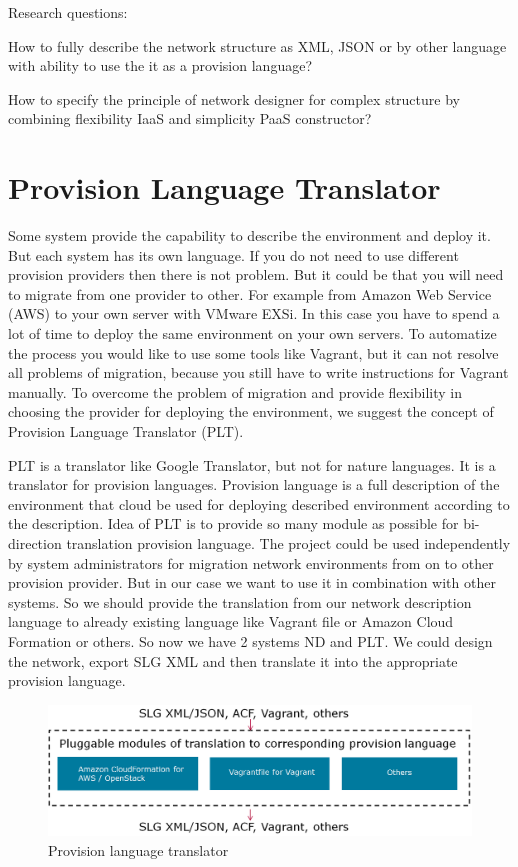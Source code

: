 \documentclass[twoside]{article}
\newcommand{\myPLT}{Provision Language Translator}
\begin{document}
Research questions:
\begin{compactitem}
\item How to fully describe the network structure as XML, JSON or by other language with ability  to use the it as a provision language?
\item How to specify the principle of network designer for complex structure by combining flexibility IaaS and simplicity PaaS constructor?  
\end{compactitem}


\section{\myPLT}
Some system provide the capability to describe the environment and deploy it. But each system has its own language. If you do not need to use different provision providers then there is not problem. But it could be that you will need to migrate from one provider to other. For example from Amazon Web Service (AWS) to your own server with VMware EXSi. In this case you have to spend a lot of time to deploy the same environment on your own servers. To automatize the process you would like to use some tools like Vagrant, but it can not resolve all problems of migration, because you still have to write instructions for Vagrant manually. To overcome the problem of migration and provide flexibility in choosing the provider for deploying the environment, we suggest the concept of Provision Language Translator (PLT). 


PLT is a translator like Google Translator, but not for nature languages. It is a translator for provision languages. Provision language is a full description of the environment that cloud be used for deploying described environment according to the description. Idea of PLT is to provide so many module as possible for bi-direction translation provision language. The project could be used independently by system administrators for migration network environments from on to other provision provider. But in our case we want to use it in combination with other systems. So we should provide the translation from our network description language to already existing language like Vagrant file or Amazon Cloud Formation or others. So now we have 2 systems ND and PLT. We could design the network, export SLG XML and then translate it into the appropriate provision language. 

\begin{figure}[ht!]
\centering
\includegraphics[width=145mm]{plt.png}
\caption{Provision language translator}
\label{overflow}
\end{figure}
     
\end{document}
